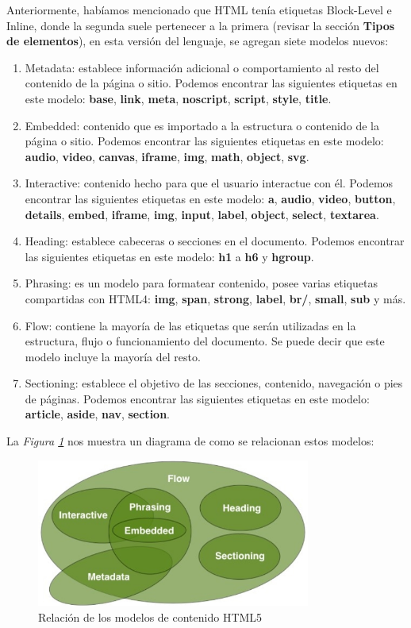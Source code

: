 Anteriormente, habíamos mencionado que HTML tenía etiquetas Block-Level e Inline, donde la segunda suele pertenecer a la primera (revisar la sección \textbf{Tipos de elementos}), en esta versión del lenguaje, se agregan siete modelos nuevos:
\begin{enumerate}
    \item Metadata: establece información adicional o comportamiento al resto del contenido de la página o sitio. Podemos encontrar las siguientes etiquetas en este modelo: \textbf{base}, \textbf{link}, \textbf{meta}, \textbf{noscript}, \textbf{script}, \textbf{style}, \textbf{title}.
    \item Embedded: contenido que es importado a la estructura o contenido de la página o sitio. Podemos encontrar las siguientes etiquetas en este modelo: \textbf{audio}, \textbf{video}, \textbf{canvas}, \textbf{iframe}, \textbf{img}, \textbf{math}, \textbf{object}, \textbf{svg}.
    \item Interactive: contenido hecho para que el usuario interactue con él. Podemos encontrar las siguientes etiquetas en este modelo: \textbf{a}, \textbf{audio}, \textbf{video}, \textbf{button}, \textbf{details}, \textbf{embed}, \textbf{iframe}, \textbf{img}, \textbf{input}, \textbf{label}, \textbf{object}, \textbf{select}, \textbf{textarea}.
    \item Heading: establece cabeceras o secciones en el documento. Podemos encontrar las siguientes etiquetas en este modelo: \textbf{h1} a \textbf{h6} y \textbf{hgroup}.
    \item Phrasing: es un modelo para formatear contenido, posee varias etiquetas compartidas con HTML4: \textbf{img}, \textbf{span}, \textbf{strong}, \textbf{label}, \textbf{br/}, \textbf{small}, \textbf{sub} y más.
    \item Flow: contiene la mayoría de las etiquetas que serán utilizadas en la estructura, flujo o funcionamiento del documento. Se puede decir que este modelo incluye la mayoría del resto.
    \item Sectioning: establece el objetivo de las secciones, contenido, navegación o pies de páginas. Podemos encontrar las siguientes etiquetas en este modelo: \textbf{article}, \textbf{aside}, \textbf{nav}, \textbf{section}.
\end{enumerate}

La \textit{Figura \ref{fig: 12}} nos muestra un diagrama de como se relacionan estos modelos:
\begin{figure}[H]
    \centering
    \caption{Relación de los modelos de contenido HTML5}
    \label{fig: 12}
    \includegraphics[width=9cm]{ss_html/modelos.png}
\end{figure}

